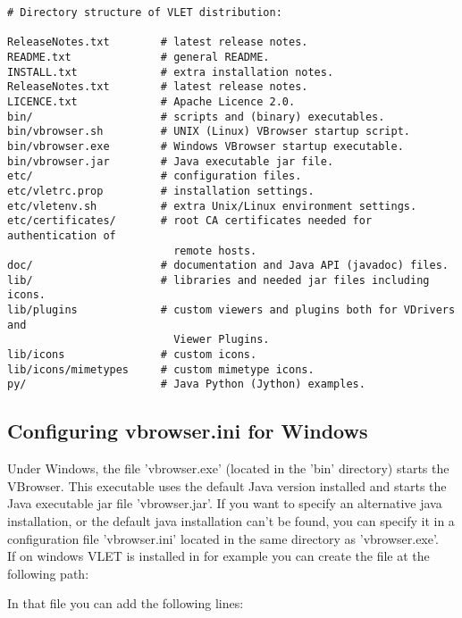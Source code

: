 \begin{boxedlisting}
\begin{verbatim}
# Directory structure of VLET distribution: 

ReleaseNotes.txt        # latest release notes.
README.txt              # general README.
INSTALL.txt             # extra installation notes. 
ReleaseNotes.txt        # latest release notes.
LICENCE.txt             # Apache Licence 2.0.
bin/                    # scripts and (binary) executables.
bin/vbrowser.sh         # UNIX (Linux) VBrowser startup script. 
bin/vbrowser.exe        # Windows VBrowser startup executable.
bin/vbrowser.jar        # Java executable jar file.
etc/                    # configuration files. 
etc/vletrc.prop         # installation settings.  
etc/vletenv.sh          # extra Unix/Linux environment settings. 
etc/certificates/       # root CA certificates needed for authentication of 
                          remote hosts.
doc/                    # documentation and Java API (javadoc) files. 
lib/                    # libraries and needed jar files including icons.
lib/plugins             # custom viewers and plugins both for VDrivers and 
                          Viewer Plugins.  
lib/icons               # custom icons. 
lib/icons/mimetypes     # custom mimetype icons.
py/                     # Java Python (Jython) examples.  
\end{verbatim}
\end{boxedlisting}


\subsection{Configuring vbrowser.ini for Windows}

Under Windows, the file 'vbrowser.exe' (located in the 'bin' directory) starts
the VBrowser.
This executable uses the default Java version installed and starts the Java
executable jar file 'vbrowser.jar'. 
If you want to specify an alternative java installation, or the default java
installation can't be found, you can specify it in a configuration file
'vbrowser.ini' located in the same directory as 'vbrowser.exe'.
\\
If on windows VLET is installed in for example  you can
create the file  at the following path:\\

	\tab {} 

In that file you can add the following lines:

